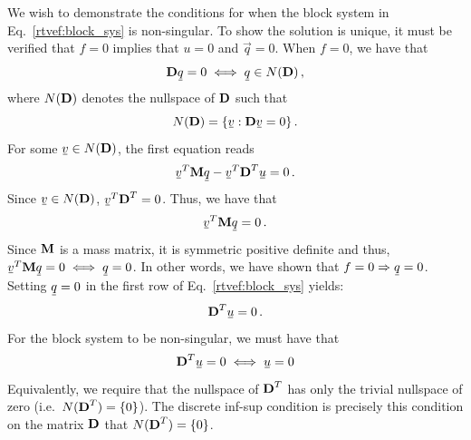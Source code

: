 \documentclass[../doc.tex]{subfiles}
\begin{document}
We wish to demonstrate the conditions for when the block system in Eq.~\ref{rtvef:block_sys} is non-singular. To show the solution is unique, it must be verified that $f = 0$ implies that $u = 0$ and $\vec{q} = 0$. When $f=0$, we have that 
	\begin{equation}
		\mat{D} \ubar{q} = 0 \iff \ubar{q} \in N(\mat{D}) \,,
	\end{equation}
where $N(\boldsymbol{\mathrm{D}})$ denotes the nullspace of $\boldsymbol{\mathrm{D}}$ such that 
	\begin{equation}
		N(\mat{D}) = \{ \ubar{v} : \mat{D}\ubar{v} = 0 \} \,. 
	\end{equation}
For some $\ubar{v} \in N(\mat{D})$, the first equation reads 
	\begin{equation}
		\ubar{v}^T \mat{M} \ubar{q} - \ubar{v}^T \mat{D}^T \ubar{u} = 0 \,. 
	\end{equation}
Since $\ubar{v} \in N(\mat{D})$, $\ubar{v}^T \mat{D}^T = 0$. Thus, we have that 
	\begin{equation}
		\ubar{v}^T \mat{M} \ubar{q} = 0 \,. 
	\end{equation}
Since $\boldsymbol{\mathrm{M}}$ is a mass matrix, it is symmetric positive definite and thus, $\ubar{v}^T \mat{M}\ubar{q} =0 \iff \ubar{q} = 0$. In other words, we have shown that $f = 0 \Rightarrow \ubar{q} = 0$. Setting $\ubar{q} = 0$ in the first row of Eq.~\ref{rtvef:block_sys} yields: 
	\begin{equation}
		\mat{D}^T \ubar{u} = 0 \,. 
	\end{equation}
For the block system to be non-singular, we must have that 
	\begin{equation}
		\mat{D}^T \ubar{u} = 0 \iff \ubar{u} = 0
	\end{equation}
Equivalently, we require that the nullspace of $\boldsymbol{\mathrm{D}}^T$ has only the trivial nullspace of zero (i.e.~$N(\boldsymbol{\mathrm{D}}^T) = \{0\}$). The discrete inf-sup condition is precisely this condition on the matrix $\boldsymbol{\mathrm{D}}$ that $N(\boldsymbol{\mathrm{D}}^T) = \{0\}$. 
\end{document}
